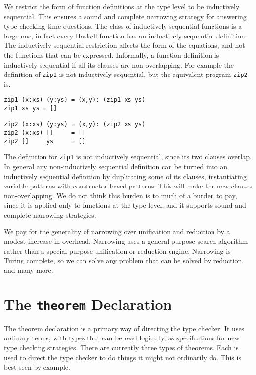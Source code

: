 \documentclass[11pt,twoside]{article}
\begin{document}
We restrict the form of function definitions at the type level to be inductively
sequential\cite{conf/alp/Antoy92}.
This ensures a sound and complete narrowing strategy for answering type-checking 
time questions. The class of inductively sequential functions is a large
one, in fact every Haskell function has an inductively sequential definition. The
inductively sequential restriction affects the form of the equations, and not the
functions that can be expressed. Informally, a function definition is
inductively sequential if all its clauses are non-overlapping. For example
the definition of {\tt zip1} is not-inductively sequential, but the equivalent
program {\tt zip2} is.

{ %
\begin{verbatim}
zip1 (x:xs) (y:ys) = (x,y): (zip1 xs ys)
zip1 xs ys = []

zip2 (x:xs) (y:ys) = (x,y): (zip2 xs ys)
zip2 (x:xs) []     = []
zip2 []     ys     = []
\end{verbatim}}

The definition for {\tt zip1} is not inductively sequential, since its two clauses overlap. In general
any non-inductively sequential definition can be turned into an inductively
sequential definition by duplicating some of its clauses, instantiating variable patterns
with constructor based patterns. This will make the new clauses non-overlapping.
We do not think this burden is to much of a burden to pay, since
it is applied only to functions at the type level, and it supports
sound and complete narrowing strategies.

We pay for the generality of narrowing over unification and reduction
by a modest increase in overhead. Narrowing uses a general purpose
search algorithm rather than a special purpose unification or
reduction engine. Narrowing is Turing complete, so we
can solve any problem that can be solved by reduction, and many more.


\section{The {\tt theorem} Declaration} \label{theorem}
The theorem declaration is a primary way of directing the type
checker. It uses ordinary terms, with types that can be read logically,
as specifcations for new  type checking strategies.  There are currently
three types of theorems. Each is used to direct the type
checker to do things it might not ordinarily do. This is
best seen by example.
\end{document}
